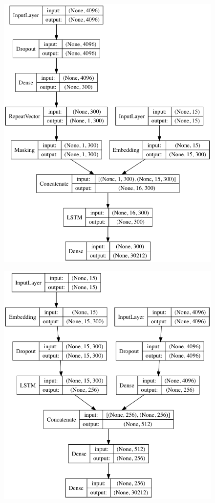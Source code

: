 \documentclass[letterpaper, 10 pt, conference]{ieeeconf}
\begin{document}
\begin{figure}[h]
\centering
\begin{minipage}{.5\textwidth}
  \centering
  \includegraphics[width=.8\linewidth]{inject}
  \label{fig:test1}
\end{minipage}%
\begin{minipage}{.5\textwidth}
  \centering
  \includegraphics[width=.8\linewidth]{merge}

\end{minipage}
\end{figure}
\end{document}
